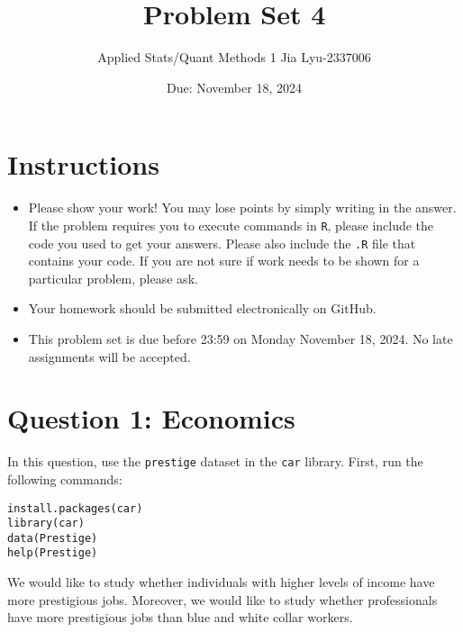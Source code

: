 \documentclass[12pt,letterpaper]{article}
\title{Problem Set 4}
\date{Due: November 18, 2024}
\author{Applied Stats/Quant Methods 1 
Jia Lyu-2337006}
\begin{document}
	\maketitle
	\section*{Instructions}
	\begin{itemize}
		\item Please show your work! You may lose points by simply writing in the answer. If the problem requires you to execute commands in \texttt{R}, please include the code you used to get your answers. Please also include the \texttt{.R} file that contains your code. If you are not sure if work needs to be shown for a particular problem, please ask.
		\item Your homework should be submitted electronically on GitHub.
		\item This problem set is due before 23:59 on Monday November 18, 2024. No late assignments will be accepted.
	\end{itemize}



	\vspace{.5cm}
\section*{Question 1: Economics}
\vspace{.25cm}
\noindent 	
In this question, use the \texttt{prestige} dataset in the \texttt{car} library. First, run the following commands:

\begin{verbatim}
install.packages(car)
library(car)
data(Prestige)
help(Prestige)
\end{verbatim} 


\noindent We would like to study whether individuals with higher levels of income have more prestigious jobs. Moreover, we would like to study whether professionals have more prestigious jobs than blue and white collar workers.
\end{document}
